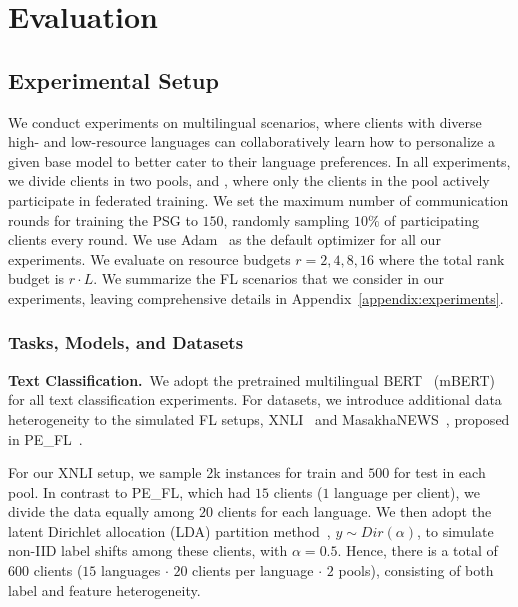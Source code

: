\section{Evaluation}\label{sec:expmts}

\subsection{Experimental Setup}

We conduct experiments on multilingual scenarios, where clients with diverse high- and low-resource languages can collaboratively learn how to personalize a given base model to better cater to their language preferences. In all experiments, we divide clients in two pools, \seen{} and \unseen{}, where only the clients in the \seen{} pool actively participate in federated training. We set the maximum number of communication rounds for training the PSG to $150$, randomly sampling $10\%$ of participating clients every round. We use Adam~\cite{Kingma_2014} as the default optimizer for all our experiments. We evaluate on resource budgets $r=2,4,8,16$ where the total rank budget is $r \cdot L$. We summarize the FL scenarios that we consider in our experiments, leaving comprehensive details in Appendix~\ref{appendix:experiments}.

\subsubsection{Tasks, Models, and Datasets}

\noindent\textbf{Text Classification.}~We adopt the pretrained multilingual BERT~\cite{BERT} (mBERT) for all text classification experiments. For datasets, we introduce additional data heterogeneity to the simulated FL setups, XNLI~\cite{XNLI} and MasakhaNEWS~\cite{MasakhaNEWS}, proposed in PE\_FL~\cite{zhao2023breaking}. 

For our XNLI setup, we sample 2k instances for train and $500$ for test in each pool. In contrast to PE\_FL, which had $15$ clients ($1$ language per client), we divide the data equally among $20$ clients for each language. We then adopt the latent Dirichlet allocation (LDA) partition method~\cite{hsu2019measuring, yurochkin2019bayesian}, $y \sim Dir(\alpha)$, to simulate non-IID label shifts among these clients, with $\alpha=0.5$. Hence, there is a total of $600$ clients ($15$ languages $\cdot$ $20$ clients per language $\cdot$ $2$ pools), consisting of both label and feature heterogeneity.

